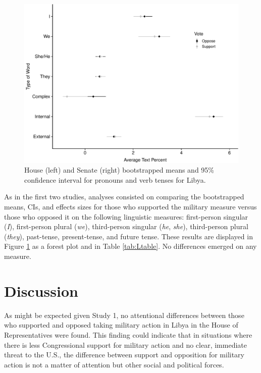 \documentclass[english,,man]{apa6}
\theoremstyle{definition}
\theoremstyle{definition}
\theoremstyle{definition}
\theoremstyle{remark}
\begin{document}
\begin{figure}
\centering
\includegraphics{Language_of_War_Markdown_KJ_files/figure-latex/Lpic-1.pdf}
\caption{\label{fig:Lpic}House (left) and Senate (right) bootstrapped means
and 95\% confidence interval for pronouns and verb tenses for Libya.}
\end{figure}

As in the first two studies, analyses consisted on comparing the
bootstrapped means, CIs, and effects sizes for those who supported the
military measure versus those who opposed it on the following linguistic
measures: first-person singular (\emph{I}), first-person plural
(\emph{we}), third-person singular (\emph{he}, \emph{she}), third-person
plural (\emph{they}), past-tense, present-tense, and future tense. These
results are displayed in Figure \ref{fig:Lpic} as a forest plot and in
Table \ref{tab:Ltable}. No differences emerged on any measure.

\hypertarget{discussion-2}{%
\section{Discussion}\label{discussion-2}}

As might be expected given Study 1, no attentional differences between
those who supported and opposed taking military action in Libya in the
House of Representatives were found. This finding could indicate that in
situations where there is less Congressional support for military action
and no clear, immediate threat to the U.S., the difference between
support and opposition for military action is not a matter of attention
but other social and political forces.
\end{document}
